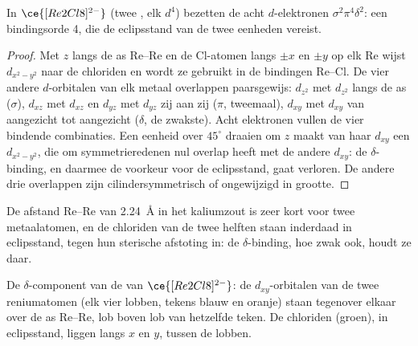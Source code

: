\begin{proposition}\label{prop:b3:organometallic-bonding:quadruple}
In $\ce{[Re2Cl8]^{2-}}$ (twee , elk $d^4$) bezetten de acht $d$-elektronen $\sigma^2\pi^4\delta^2$: een
bindingsorde 4, die de eclipsstand van de twee eenheden  vereist.
\end{proposition}

\begin{proof}
Met $z$ langs de as Re--Re en de Cl-atomen langs $\pm x$ en $\pm y$ op elk Re wijst $d_{x^2-y^2}$
naar de chloriden en wordt ze gebruikt in de bindingen Re--Cl. De vier andere $d$-orbitalen
van elk metaal overlappen paarsgewijs: $d_{z^2}$ met $d_{z^2}$ langs de as ($\sigma$), $d_{xz}$ met $d_{xz}$ en $d_{yz}$
met $d_{yz}$ zij aan zij ($\pi$, tweemaal), $d_{xy}$ met $d_{xy}$ van aangezicht tot aangezicht ($\delta$, de zwakste).
Acht elektronen vullen de vier bindende combinaties. Een eenheid over $45^\circ$
draaien om $z$ maakt van haar $d_{xy}$ een $d_{x^2-y^2}$, die om symmetrieredenen nul overlap heeft met de andere $d_{xy}$:
de $\delta$-binding, en daarmee de voorkeur voor de eclipsstand, gaat
verloren. De andere drie overlappen zijn cilindersymmetrisch of
ongewijzigd in grootte.
\end{proof}

De afstand Re--Re van \qty{2.24}{\angstrom} in het kaliumzout is zeer kort voor twee metaalatomen, en de chloriden van de twee helften staan inderdaad in eclipsstand, tegen
hun sterische afstoting in: de $\delta$-binding, hoe zwak ook, houdt ze daar.

\begin{omfigure}

{\small De $\delta$-component van de  van $\ce{[Re2Cl8]^{2-}}$: de $d_{xy}$-orbitalen van
de twee reniumatomen (elk vier lobben, tekens blauw en oranje) staan
tegenover elkaar over de as Re--Re, lob boven lob van hetzelfde teken. De chloriden (groen),
in eclipsstand, liggen langs $x$ en $y$, tussen de lobben.}
\end{omfigure}

